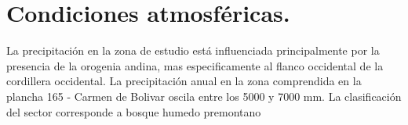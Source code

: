 \section{Condiciones atmosf\'{e}ricas.}
La precipitaci\'{o}n en la zona de estudio est\'{a} influenciada principalmente por la presencia de la orogenia andina, mas especificamente al flanco occidental de la cordillera occidental. La precipitaci\'{o}n anual en la zona comprendida en la plancha 165 - Carmen de Bolivar oscila entre los 5000 y 7000 mm. \cite{precipitacion} La clasificaci\'on del sector corresponde a bosque humedo premontano \cite{bosque}


